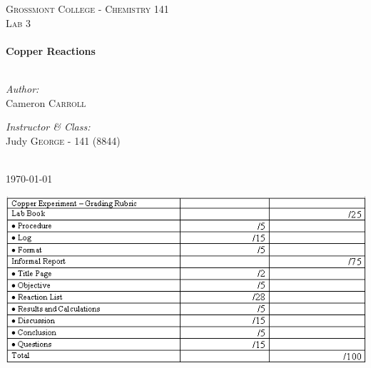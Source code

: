 \begin{titlepage}
\begin{center}

\textsc{\Large Grossmont College - Chemistry 141}\\[1.5cm]
\textsc{\Large Lab 3}\\[0.5cm]

\HRule \\[0.4cm]
{ \LARGE \bfseries Copper Reactions}\\[0.5cm]

\HRule \\[1.5cm]

\begin{minipage}{0.4\textwidth}
\begin{flushleft} \large
\emph{Author:}\\
Cameron \textsc{Carroll}
\end{flushleft}
\end{minipage}
\begin{minipage}{0.4\textwidth}
\begin{flushright} \large
\emph{Instructor \& Class:}\\
Judy \textsc{George} - 141 (8844)
\end{flushright}
\end{minipage}\\[2cm]

{\large \today}

\vfill

\includegraphics{./copper_rxn_rubric.png}\\[1cm]



\end{center}
\end{titlepage}